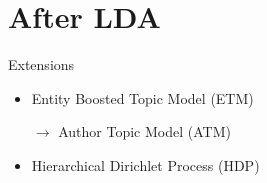 \documentclass[10pt]{beamer}
\begin{document}
\section{After LDA}
\begin{frame}{Extensions}
  \begin{itemize}
  \item Entity Boosted Topic Model (ETM)
  \item[$\rightarrow$] Author Topic Model (ATM)
  \item Hierarchical Dirichlet Process (HDP)
  \end{itemize}
\end{frame}
\end{document}
